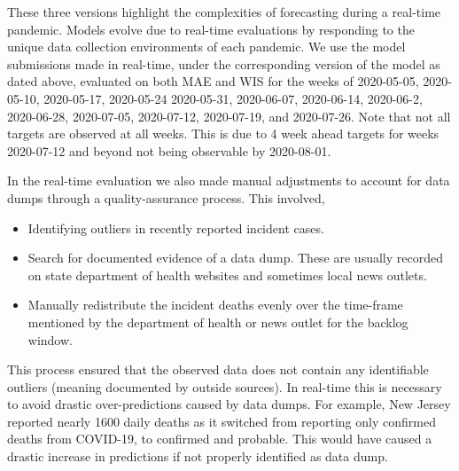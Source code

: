 \documentclass[11pt]{amsart}
\begin{document}
 
 These three versions highlight the complexities of forecasting during a real-time pandemic. Models evolve due to real-time evaluations by responding to the unique data collection environments of each pandemic. We use the model submissions made in real-time, under the corresponding version of the model as dated above, evaluated on both MAE and WIS for the weeks of 2020-05-05, 2020-05-10, 2020-05-17, 2020-05-24 2020-05-31, 2020-06-07, 2020-06-14, 2020-06-2, 2020-06-28, 2020-07-05, 2020-07-12, 2020-07-19, and 2020-07-26. Note that not all targets are observed at all weeks. This is due to 4 week ahead targets for weeks 2020-07-12 and beyond not being observable by 2020-08-01.
 
 In the real-time evaluation we also made manual adjustments to account for data dumps through a quality-assurance process. This involved,
 
 \begin{itemize}
 \item Identifying outliers in recently reported incident cases.
 \item Search for documented evidence of a data dump. These are usually recorded on state department of health websites and sometimes local news outlets.
 \item Manually redistribute the incident deaths evenly over the time-frame mentioned by the department of health or news outlet for the backlog window.
 \end{itemize}
 
 
 This process ensured that the observed data does not contain any identifiable outliers (meaning documented by outside sources). In real-time this is necessary to avoid drastic over-predictions caused by data dumps. For example, New Jersey reported nearly 1600 daily deaths as it switched from reporting only confirmed deaths from COVID-19, to confirmed and probable. This would have caused a drastic increase in predictions if not properly identified as data dump. 
 
\end{document}
